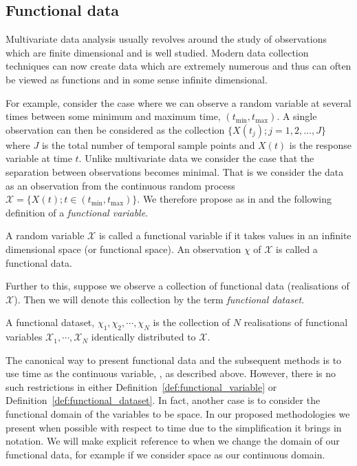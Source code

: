 \subsection{Functional data \label{ssec:fd}}
Multivariate data analysis usually revolves around the study of observations which are finite dimensional and is well studied.
Modern data collection techniques can now create data which are extremely numerous and thus can often be viewed as functions and in some sense infinite dimensional.

For example, \citeauthor{ferraty_nonparametric_2006} consider the case where we can observe a random variable at several times between some minimum and maximum time, $\left( t_{\text{min}}, t_{\text{max}} \right)$.
A single observation can then be considered as the collection $ \{ X(t_j) ; j=1,2,\dots, J\}$ where $J$ is the total number of temporal sample points and $X(t)$ is the response variable at time $t$.
Unlike multivariate data we consider the case that the separation between observations becomes minimal.
That is we consider the data as an observation from the continuous random process $\mathcal{X} = \{X(t); t \in \left( t_\text{min}, t_\text{max} \right)\}$.
We therefore propose as in \citep{ferraty_nonparametric_2006} and \citep{shi_gaussian_2011} the following definition of a \textit{functional variable}.

 \begin{definition}
	A random variable $\mathcal{X}$ is called a functional variable if it takes values in an infinite dimensional space (or functional space). An observation $\chi$ of $\mathcal{X}$ is called a functional data.
	\label{def:functional_variable}
\end{definition}

Further to this, suppose we observe a collection of functional data (realisations of $\mathcal{X}$).
Then we will denote this collection by the term \textit{functional dataset}.

\begin{definition}
	A functional dataset, $\chi_1, \chi_2, \cdots, \chi_N$ is the collection of $N$ realisations of functional variables $\mathcal{X}_1, \cdots, \mathcal{X}_N$ identically distributed to $\mathcal{X}$.
	\label{def:functional_dataset}
\end{definition}

The canonical way to present functional data and the subsequent methods is to use time as the continuous variable, \cite{ramsay_functional_2010, ferraty_nonparametric_2006, shi_gaussian_2011}, as described above.
However, there is no such restrictions in either Definition~\ref{def:functional_variable} or Definition~\ref{def:functional_dataset}. 
In fact, another case is to consider the functional domain of the variables to be space.
In our proposed methodologies we present when possible with respect to time due to the simplification it brings in notation.
We will make explicit reference to when we change the domain of our functional data, for example if we consider space as our continuous domain. 

